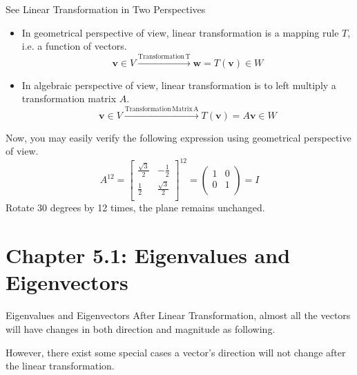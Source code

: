 \documentclass{beamer}
\begin{document}
\begin{frame}{See Linear Transformation in Two Perspectives}
\begin{itemize}
    \item In geometrical perspective of view, linear transformation is a mapping rule $T$, i.e. a function of vectors.
    \begin{equation*}
    \mathbf{v}\in V\xrightarrow{\mathrm{Transformation \,T}}\mathbf{w}=T\left( \mathbf{v} \right) \in W      
    \end{equation*}
    \item In algebraic perspective of view, linear transformation is to left multiply a transformation matrix $A$.
    \begin{equation*}
    \mathbf{v}\in V\xrightarrow{\mathrm{Transformation \,Matrix \,A}}T\left( \mathbf{v} \right)=A\mathbf{v} \in W      
    \end{equation*}
\end{itemize}

Now, you may easily verify the following expression using geometrical perspective of view.
\begin{equation*}
    A^{12}=\left[ \begin{matrix}
	\frac{\sqrt{3}}{2}&		-\frac{1}{2}\\
	\frac{1}{2}&		\frac{\sqrt{3}}{2}\\
\end{matrix} \right] ^{12}=\left( \begin{matrix}
	1&		0\\
	0&		1\\
\end{matrix} \right) =I
\end{equation*}
Rotate 30 degrees by 12 times, the plane remains unchanged.
\end{frame}



\section{Chapter 5.1: Eigenvalues and Eigenvectors}

\begin{frame}{Eigenvalues and Eigenvectors}
After Linear Transformation, almost all the vectors will have changes in both direction and magnitude as following.


However, there exist some special cases a vector's direction will not change after the linear transformation.

\end{frame}
\end{document}
